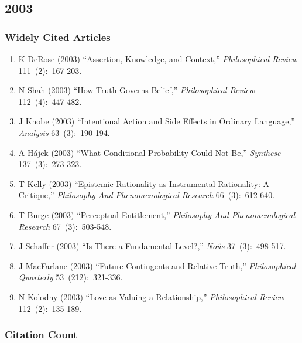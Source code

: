 \documentclass[
  10pt,
  letterpaper,
  DIV=11,
  numbers=noendperiod,
  twoside]{scrartcl}
\providecommand{\tightlist}{%
  \setlength{\itemsep}{0pt}\setlength{\parskip}{0pt}}\usepackage{longtable,booktabs,array}
\begin{document}
\newpage

\subsection{2003}\label{sec-s2003}

\subsubsection*{Widely Cited Articles}\label{widely-cited-articles-47}

\begin{enumerate}
\def\labelenumi{\arabic{enumi}.}
\tightlist
\item
  K DeRose (2003) ``Assertion, Knowledge, and Context,''
  \emph{Philosophical Review} 111~(2):~167-203.
\item
  N Shah (2003) ``How Truth Governs Belief,'' \emph{Philosophical
  Review} 112~(4):~447-482.
\item
  J Knobe (2003) ``Intentional Action and Side Effects in Ordinary
  Language,'' \emph{Analysis} 63~(3):~190-194.
\item
  A Hájek (2003) ``What Conditional Probability Could Not Be,''
  \emph{Synthese} 137~(3):~273-323.
\item
  T Kelly (2003) ``Epistemic Rationality as Instrumental Rationality: A
  Critique,'' \emph{Philosophy And Phenomenological Research}
  66~(3):~612-640.
\item
  T Burge (2003) ``Perceptual Entitlement,'' \emph{Philosophy And
  Phenomenological Research} 67~(3):~503-548.
\item
  J Schaffer (2003) ``Is There a Fundamental Level?,'' \emph{Noûs}
  37~(3):~498-517.
\item
  J MacFarlane (2003) ``Future Contingents and Relative Truth,''
  \emph{Philosophical Quarterly} 53~(212):~321-336.
\item
  N Kolodny (2003) ``Love as Valuing a Relationship,''
  \emph{Philosophical Review} 112~(2):~135-189.
\end{enumerate}

\subsubsection*{Citation Count}\label{sec-count-2003}
\end{document}
